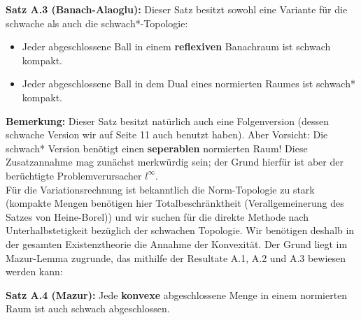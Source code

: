 \documentclass[
	language=german, %
	type=seminar, %
]{isthesis}
\begin{document}
\begin{appendix}
\colorbox{theored}{\begin{minipage}{16cm}{\textcolor{black}{}}
\textbf{Satz A.3 (Banach-Alaoglu):} Dieser Satz besitzt sowohl eine Variante für die schwache als auch die schwach*-Topologie:
\begin{itemize}
    \item Jeder abgeschlossene Ball in einem \textbf{reflexiven} Banachraum ist schwach kompakt.
    \item Jeder abgeschlossene Ball in dem Dual eines normierten Raumes ist schwach* kompakt.
\end{itemize}
\end{minipage}}

\textbf{Bemerkung:} Dieser Satz besitzt natürlich auch eine Folgenversion (dessen schwache Version wir auf Seite 11 auch benutzt haben). Aber Vorsicht: Die schwach* Version benötigt einen \textbf{seperablen} normierten Raum! Diese Zusatzannahme mag zunächst merkwürdig sein; der Grund hierfür ist aber der berüchtigte Problemverursacher \(l^{\infty}\).\\

Für die Variationsrechnung ist bekanntlich die Norm-Topologie zu stark (kompakte Mengen benötigen hier Totalbeschränktheit (Verallgemeinerung des Satzes von Heine-Borel)) und wir suchen für die direkte Methode nach Unterhalbstetigkeit bezüglich der schwachen Topologie. Wir benötigen deshalb in der gesamten Existenztheorie die Annahme der Konvexität. Der Grund liegt im Mazur-Lemma zugrunde, das mithilfe der Resultate A.1, A.2 und A.3 bewiesen werden kann:\\
\colorbox{theored}{\begin{minipage}{16cm}{\textcolor{black}{}}
\textbf{Satz A.4 (Mazur):} Jede \textbf{konvexe} abgeschlossene Menge in einem normierten Raum ist auch schwach abgeschlossen.
\end{minipage}}
\\


\end{appendix}
\end{document}

